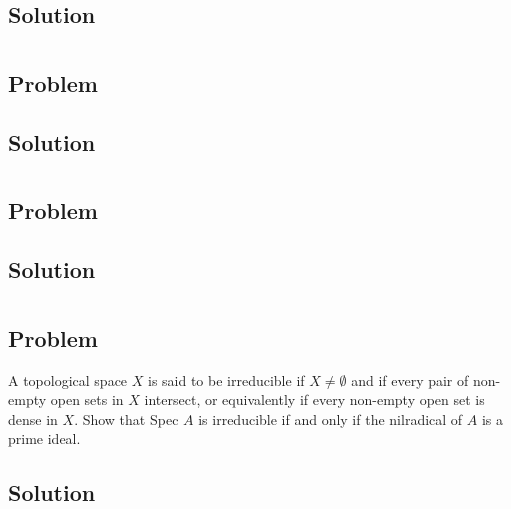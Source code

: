 \documentclass[book,12pt,oneside,openany]{memoir}
\begin{document}
\subsection{Solution}



\section{}
\subsection{Problem}

\subsection{Solution}



\section{}
\subsection{Problem}

\subsection{Solution}



\section{}
\subsection{Problem}
A topological space $X$ is said to be irreducible if $X \neq \emptyset$ and if every pair of non-empty open sets in $X$ intersect, or equivalently if every non-empty open set is dense in $X$. Show that Spec $A$ is irreducible if and only if the nilradical of $A$ is a prime ideal.
\subsection{Solution}



\section{}
\end{document}
